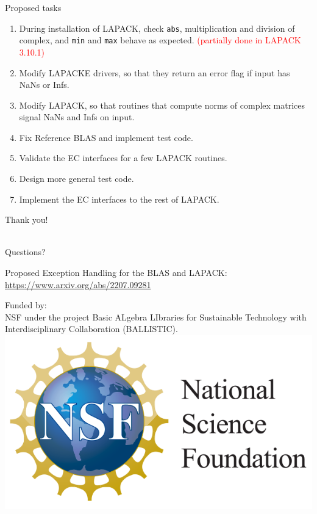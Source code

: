 \documentclass[11pt]{beamer}
\begin{document}
\begin{frame}{Proposed tasks}

	\begin{enumerate}
		\setlength\itemsep{0.7em}
		\item During installation of LAPACK, check \texttt{abs}, multiplication and division of complex, and \texttt{min} and \texttt{max} behave as expected. \textcolor{red}{(partially done in LAPACK 3.10.1)}
		\item Modify LAPACKE drivers, so that they return an error flag if input has NaNs or Infs.
		\item Modify LAPACK, so that routines that compute norms of complex matrices signal NaNs and Infs on input.
		\item Fix Reference BLAS and implement test code.
		\item Validate the EC interfaces for a few LAPACK routines.
		\item Design more general test code.
		\item Implement the EC interfaces to the rest of LAPACK.
	\end{enumerate}

\end{frame}

\begin{frame}

\vspace{50pt}
\begin{center}
	{\LARGE Thank you!}
	
	~\\
	{\Large Questions?}
\end{center}

\vspace{30pt}
\begin{center}
	\small
Proposed Exception Handling
for the BLAS and LAPACK:\\ \url{https://www.arxiv.org/abs/2207.09281}
\end{center}

\vspace{10pt}
\begin{center}
	\small
Funded by:\\
NSF under the project
Basic ALgebra LIbraries for Sustainable
Technology with Interdisciplinary Collaboration
(BALLISTIC).\\
\includegraphics[height=.15\linewidth]{img/NSF}
\end{center}

\end{frame}
\end{document}
